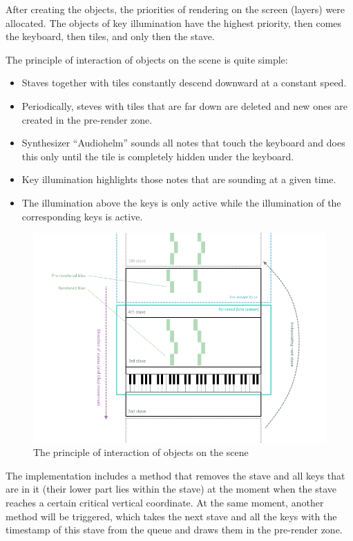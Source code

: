 \documentclass[thesis=B,english]{FITthesis}[2019/12/23]
\begin{document}
After creating the objects, the priorities of rendering on the screen (layers) were allocated. The objects of key illumination have the highest priority, then comes the keyboard, then tiles, and only then the stave.

The principle of interaction of objects on the scene is quite simple:
\begin{itemize}
    \item Staves together with tiles constantly descend downward at a constant speed.
    \item Periodically, steves with tiles that are far down are deleted and new ones are created in the pre-render zone.
    \item Synthesizer “Audiohelm” sounds all notes that touch the keyboard and does this only until the tile is completely hidden under the keyboard.
    \item Key illumination highlights those notes that are sounding at a given time.
    \item The illumination above the keys is only active while the illumination of the corresponding keys is active.
\end{itemize}

\begin{figure}[ht]
            \includegraphics[width=\textwidth]{Scheme1.png}
            \caption{The principle of interaction of objects on the scene}
            \label{fig:Scheme1}
\end{figure}

The implementation includes a method that removes the stave and all keys that are in it (their lower part lies within the stave) at the moment when the stave reaches a certain critical vertical coordinate. At the same moment, another method will be triggered, which takes the next stave and all the keys with the timestamp of this stave from the queue and draws them in the pre-render zone.
\end{document}
